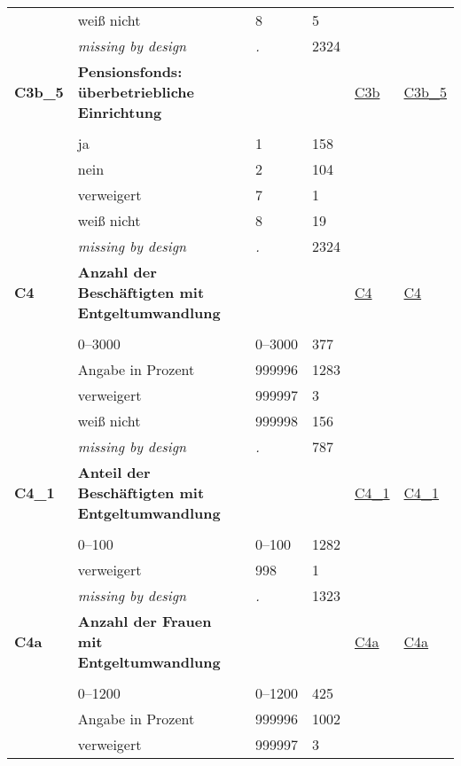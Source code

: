 \begin{longtable}{| L{2.45cm} | L{6cm} | C{1.5cm} | R{1cm} | C{2.25cm} | C{2.25cm} |}
   & weiß nicht & 8 & 5 &  &  \\ 
   & \textit{missing by design} & \textit{.} & 2324 &  &  \\ 
   \midrule
\textbf{C3b\_5}\label{var:C3b:5} & \textbf{Pensionsfonds: überbetriebliche Einrichtung} &  &  & \hyperref[C3b]{C3b} & \hyperref[var:suf:C3b:5]{C3b\_5} \\ 
   &  &  &  &  &  \\ 
   & ja & 1 & 158 &  &  \\ 
   & nein & 2 & 104 &  &  \\ 
   & verweigert & 7 & 1 &  &  \\ 
   & weiß nicht & 8 & 19 &  &  \\ 
   & \textit{missing by design} & \textit{.} & 2324 &  &  \\ 
   \midrule
\textbf{C4}\label{var:C4} & \textbf{Anzahl der Beschäftigten mit Entgeltumwandlung} &  &  & \hyperref[C4]{C4} & \hyperref[var:suf:C4]{C4} \\ 
   &  &  &  &  &  \\ 
   & 0--3000 & 0--3000 & 377 &  &  \\ 
   & Angabe in Prozent & 999996 & 1283 &  &  \\ 
   & verweigert & 999997 & 3 &  &  \\ 
   & weiß nicht & 999998 & 156 &  &  \\ 
   & \textit{missing by design} & \textit{.} & 787 &  &  \\ 
   \midrule
\textbf{C4\_1}\label{var:C4:1} & \textbf{Anteil der Beschäftigten mit Entgeltumwandlung} &  &  & \hyperref[C4:1]{C4\_1} & \hyperref[var:suf:C4:1]{C4\_1} \\ 
   &  &  &  &  &  \\ 
   & 0--100 & 0--100 & 1282 &  &  \\ 
   & verweigert & 998 & 1 &  &  \\ 
   & \textit{missing by design} & \textit{.} & 1323 &  &  \\ 
   \midrule
\textbf{C4a}\label{var:C4a} & \textbf{Anzahl der Frauen mit Entgeltumwandlung} &  &  & \hyperref[C4a]{C4a} & \hyperref[var:suf:C4a]{C4a} \\ 
   &  &  &  &  &  \\ 
   & 0--1200 & 0--1200 & 425 &  &  \\ 
   & Angabe in Prozent & 999996 & 1002 &  &  \\ 
   & verweigert & 999997 & 3 &  &  \\ 

\end{longtable}
